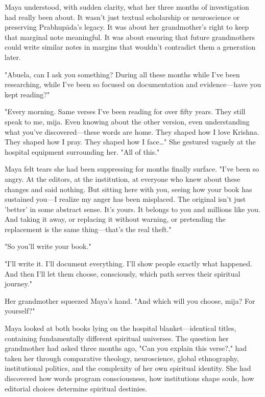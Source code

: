 \documentclass[12pt,twoside]{book}
\begin{document}
Maya understood, with sudden clarity, what her three months of investigation had really been about. It wasn't just textual scholarship or neuroscience or preserving Prabhupāda's legacy. It was about her grandmother's right to keep that marginal note meaningful. It was about ensuring that future grandmothers could write similar notes in margins that wouldn't contradict them a generation later.

"Abuela, can I ask you something? During all these months while I've been researching, while I've been so focused on documentation and evidence—have you kept reading?"

"Every morning. Same verses I've been reading for over fifty years. They still speak to me, mija. Even knowing about the other version, even understanding what you've discovered—these words are home. They shaped how I love Krishna. They shaped how I pray. They shaped how I face\ldots{}" She gestured vaguely at the hospital equipment surrounding her. "All of this."

Maya felt tears she had been suppressing for months finally surface. "I've been so angry. At the editors, at the institution, at everyone who knew about these changes and said nothing. But sitting here with you, seeing how your book has sustained you—I realize my anger has been misplaced. The original isn't just 'better' in some abstract sense. It's yours. It belongs to you and millions like you. And taking it away, or replacing it without warning, or pretending the replacement is the same thing—that's the real theft."

"So you'll write your book."

"I'll write it. I'll document everything. I'll show people exactly what happened. And then I'll let them choose, consciously, which path serves their spiritual journey."

Her grandmother squeezed Maya's hand. "And which will you choose, mija? For yourself?"

Maya looked at both books lying on the hospital blanket—identical titles, containing fundamentally different spiritual universes. The question her grandmother had asked three months ago, "Can you explain this verse?," had taken her through comparative theology, neuroscience, global ethnography, institutional politics, and the complexity of her own spiritual identity. She had discovered how words program consciousness, how institutions shape souls, how editorial choices determine spiritual destinies.

\vspace{0.5cm}
\end{document}
